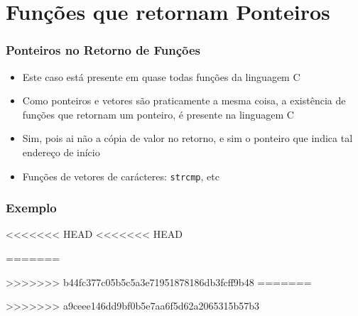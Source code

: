 \section{Funções que retornam Ponteiros}

\begin{frame}[fragile,c]
\frametitle{Ponteiros no  Retorno de Funções}
  \begin{itemize}[<+->]
   \item Este caso está presente em quase todas funções da linguagem C
   \item Como ponteiros e vetores são praticamente a mesma coisa,
   a existência de funções que retornam um ponteiro, é presente na linguagem C
   \item Sim, pois ai não a cópia de valor no retorno, e sim
   o ponteiro que indica tal endereço de início
   \item Funções de vetores de carácteres: \texttt{strcmp}, etc
   

   \end{itemize}
\end{frame}



\begin{frame}[allowframebreaks=0.9, c]
\frametitle{Exemplo}
   
<<<<<<< HEAD
<<<<<<< HEAD

=======

>>>>>>> b44fc377c05b5c5a3e71951878186db3fcff9b48
=======

>>>>>>> a9ceee146dd9bf0b5e7aa6f5d62a2065315b57b3

\end{frame}



